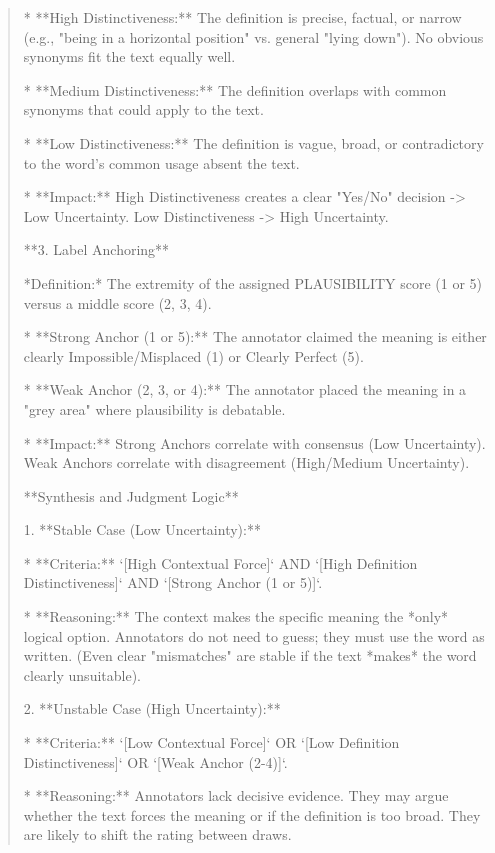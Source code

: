 \begin{quote}
*   **High Distinctiveness:** The definition is precise, factual, or narrow (e.g., "being in a horizontal position" vs. general "lying down"). No obvious synonyms fit the text equally well.

*   **Medium Distinctiveness:** The definition overlaps with common synonyms that could apply to the text.

*   **Low Distinctiveness:** The definition is vague, broad, or contradictory to the word's common usage absent the text.

*   **Impact:** High Distinctiveness creates a clear "Yes/No" decision -> Low Uncertainty. Low Distinctiveness -> High Uncertainty.



**3. Label Anchoring**

*Definition:* The extremity of the assigned PLAUSIBILITY score (1 or 5) versus a middle score (2, 3, 4).

*   **Strong Anchor (1 or 5):** The annotator claimed the meaning is either clearly Impossible/Misplaced (1) or Clearly Perfect (5).

*   **Weak Anchor (2, 3, or 4):** The annotator placed the meaning in a "grey area" where plausibility is debatable.

*   **Impact:** Strong Anchors correlate with consensus (Low Uncertainty). Weak Anchors correlate with disagreement (High/Medium Uncertainty).



**Synthesis and Judgment Logic**



1.  **Stable Case (Low Uncertainty):**

    *   **Criteria:** `[High Contextual Force]` AND `[High Definition Distinctiveness]` AND `[Strong Anchor (1 or 5)]`.

    *   **Reasoning:** The context makes the specific meaning the *only* logical option. Annotators do not need to guess; they must use the word as written. (Even clear "mismatches" are stable if the text *makes* the word clearly unsuitable).



2.  **Unstable Case (High Uncertainty):**

    *   **Criteria:** `[Low Contextual Force]` OR `[Low Definition Distinctiveness]` OR `[Weak Anchor (2-4)]`.

    *   **Reasoning:** Annotators lack decisive evidence. They may argue whether the text forces the meaning or if the definition is too broad. They are likely to shift the rating between draws.


\end{quote}
